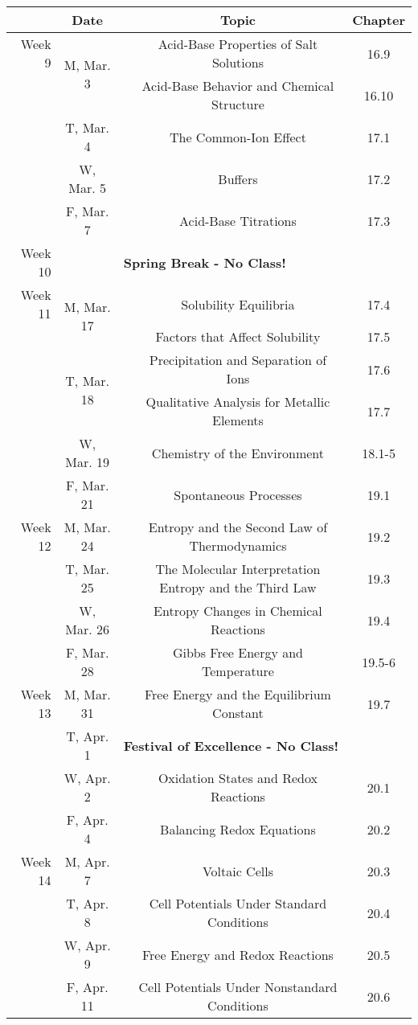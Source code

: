 \documentclass[12pt, letterpaper]{article}
\begin{document}
\begin{tabular}{rcccc}
& Date && Topic & Chapter\\
\midrule
Week 9 & \multirow{2}{*}{M, Mar. 3}& & Acid-Base Properties of Salt Solutions & 16.9\\
& & & Acid-Base Behavior and Chemical Structure & 16.10\\
& T, Mar. 4&& The Common-Ion Effect & 17.1\\
& W, Mar. 5&& Buffers & 17.2\\
& F, Mar. 7&& Acid-Base Titrations & 17.3\\
\midrule
Week 10 & & \multicolumn{3}{l}{\textbf{Spring Break - No Class!}}\\
\midrule
Week 11 & \multirow{2}{*}{M, Mar. 17}& & Solubility Equilibria & 17.4\\
& & & Factors that Affect Solubility & 17.5\\
& \multirow{2}{*}{T, Mar. 18}& & Precipitation and Separation of Ions & 17.6\\
& & & Qualitative Analysis for Metallic Elements & 17.7\\
& W, Mar. 19&& Chemistry of the Environment & 18.1-5\\
& F, Mar. 21&& Spontaneous Processes & 19.1\\
\midrule
Week 12 & M, Mar. 24&& Entropy and the Second Law of Thermodynamics & 19.2\\
& T, Mar. 25&& The Molecular Interpretation Entropy and the Third Law & 19.3\\
& W, Mar. 26&& Entropy Changes in Chemical Reactions & 19.4\\
& F, Mar. 28&& Gibbs Free Energy and Temperature & 19.5-6\\
\midrule
Week 13 & M, Mar. 31&& Free Energy and the Equilibrium Constant & 19.7\\
& T, Apr. 1& \multicolumn{3}{l}{\textbf{Festival of Excellence - No Class!}}\\
& W, Apr. 2&& Oxidation States and Redox Reactions & 20.1\\
& F, Apr. 4&& Balancing Redox Equations & 20.2\\
\midrule
Week 14 & M, Apr. 7&& Voltaic Cells & 20.3\\
& T, Apr. 8&& Cell Potentials Under Standard Conditions & 20.4\\
& W, Apr. 9&& Free Energy and Redox Reactions & 20.5\\
& F, Apr. 11&& Cell Potentials Under Nonstandard Conditions & 20.6\\
\end{tabular}
\end{document}
